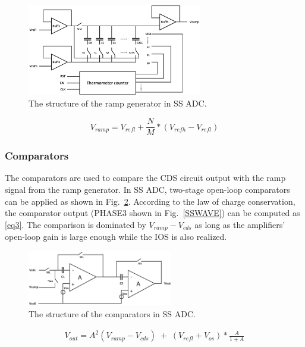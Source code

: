 \begin{figure}[htbp]
	\centerline{\includegraphics[width=3in]{./Figures/RAMP.eps}}
	\caption{The structure of the ramp generator in SS ADC.}
	\label{RAMP}
\end{figure} 

\begin{equation}
	V_{ramp}=V_{refl}+\frac{N}{M}\ast\left(V_{refh}-V_{refl}\right)
	\label{eq2}
\end{equation}

\subsubsection{Comparators}

The comparators are used to compare the CDS circuit output with the ramp signal from the ramp generator. 
In SS ADC, two-stage open-loop comparators can be applied as shown in Fig.~\ref{COM}. According to the law of charge conservation, 
the comparator output (PHASE3 shown in Fig.~\ref{SSWAVE}) can be computed as \eqref{eq3}. The comparison is dominated by $V_{ramp}-V_{cds}$ as long as the amplifiers’ open-loop gain 
is large enough while the IOS is also realized.%

\begin{figure}[htbp]
	\centerline{\includegraphics[width=2.5in]{./Figures/COM.eps}}
	\caption{The structure of the comparators in SS ADC.}
	\label{COM}
\end{figure} 

\begin{equation}
	\begin{aligned}
		V_{out}=A^2(V_{ramp}-V_{cds})
		\;{+}\;\left(V_{refl}+V_{os}\right)\ast\frac{A}{1+A} 		
		\label{eq3}
	\end{aligned}
\end{equation}

